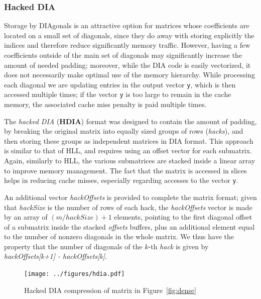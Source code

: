 \subsubsection*{Hacked DIA}

Storage by DIAgonals is an attractive option for matrices whose
coefficients are located on a small set of diagonals, since they do
away with storing explicitly the indices and therefore reduce
significantly memory traffic. However, having a few coefficients
outside of the main set of diagonals may  significantly increase the
amount of needed padding; moreover, while the DIA code is easily
vectorized, it does not necessarily make optimal use of the memory
hierarchy. While processing each diagonal we are updating entries in
the output vector \verb|y|, which is then accessed multiple times; if 
the vector \verb|y| is too large to remain in the cache memory, the
associated cache miss penalty is paid multiple times. 

The \textit{hacked DIA} (\textbf{HDIA}) format was designed to contain
the amount of padding, by  breaking  the original matrix
into equally sized groups of rows (\textit{hacks}), and then storing
these groups as independent matrices in DIA format. This approach is
similar to that of HLL, and requires using an offset vector for each
submatrix. Again, similarly to HLL, the various submatrices are
stacked inside a linear array to improve memory management. The fact
that the matrix is accessed in slices helps in reducing cache misses,
especially regarding accesses to the %
vector \verb|y|.  


An additional vector \textit{hackOffsets} is provided to complete
the matrix format; given  that \textit{hackSize} is the number of rows of each hack,
the \textit{hackOffsets} vector is made by an array of
$(m/hackSize)+1$ elements,  pointing to the first diagonal offset of a
submatrix inside the stacked \textit{offsets} buffers, plus an
additional element equal to the number of nonzero diagonals in the whole matrix. 
We thus have the property that  
the number of diagonals of the $k$-th \textit{hack} is given by
\textit{hackOffsets[k+1] - hackOffsets[k]}.  

\begin{figure}[ht]
	\centering
		\texttt{[image: ../figures/hdia.pdf]}
	\caption{Hacked DIA compression of matrix in Figure~\ref{fig:dense}}
	\label{fig:hdia}
\end{figure} 

